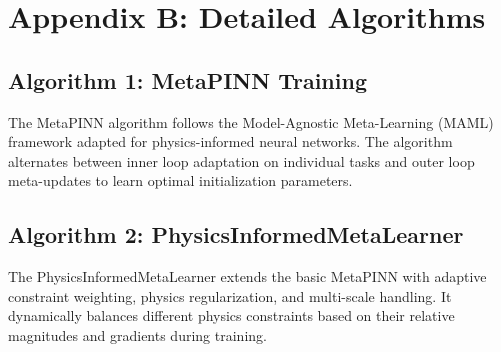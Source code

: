 \documentclass[review]{elsarticle}
\begin{document}
\section{Appendix B: Detailed Algorithms}

\subsection{Algorithm 1: MetaPINN Training}
The MetaPINN algorithm follows the Model-Agnostic Meta-Learning (MAML) framework adapted for physics-informed neural networks. The algorithm alternates between inner loop adaptation on individual tasks and outer loop meta-updates to learn optimal initialization parameters.

\subsection{Algorithm 2: PhysicsInformedMetaLearner}  
The PhysicsInformedMetaLearner extends the basic MetaPINN with adaptive constraint weighting, physics regularization, and multi-scale handling. It dynamically balances different physics constraints based on their relative magnitudes and gradients during training.


\end{document}
